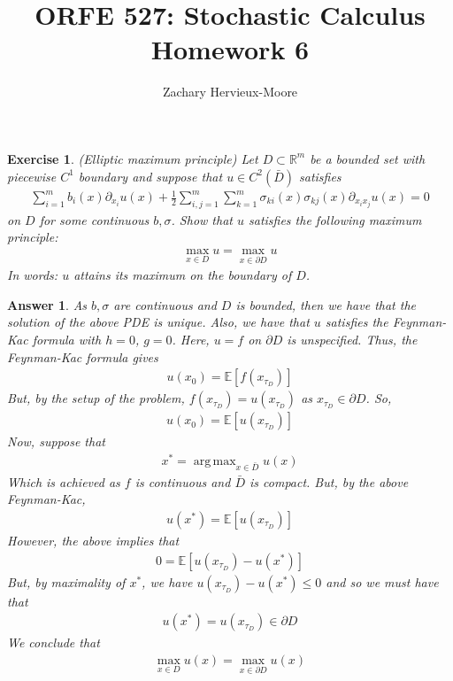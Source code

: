 \documentclass[12pt]{article}
\title{ORFE 527: Stochastic Calculus \\ Homework 6}
\author{Zachary Hervieux-Moore}
\date{\displaydate{date}}
\DeclareMathOperator*{\argmax}{arg\,max}
\theoremstyle{colon}
\newtheorem{exercise}{Exercise}
\newtheorem*{answer}{Answer}
\begin{document}
\maketitle

\clearpage

\begin{exercise}
  (Elliptic maximum principle) Let $D \subset \mathbb{R}^m$ be a bounded set with piecewise $C^1$ boundary and suppose that $u \in C^2 (\bar{D})$ satisfies
  \begin{gather*}
    \sum_{i=1}^m b_i(x) \partial_{x_i} u(x) + \frac{1}{2} \sum_{i,j = 1}^m \sum_{k=1}^m \sigma_{ki}(x) \sigma_{kj}(x) \partial_{x_i x_j} u(x) = 0
  \end{gather*}
  on $D$ for some continuous $b, \sigma$. Show that $u$ satisfies the following \textit{maximum principle}:
  \begin{gather*}
    \max_{x \in D} u = \max_{x \in \partial D} u
  \end{gather*}
  In words: $u$ attains its maximum on the boundary of $D$.
\end{exercise}

\begin{answer}
  As $b, \sigma$ are continuous and $D$ is bounded, then we have that the solution of the above PDE is unique. Also, we have that $u$ satisfies the Feynman-Kac formula with $h = 0$, $g = 0$. Here, $u = f$ on $\partial D$ is unspecified. Thus, the Feynman-Kac formula gives
  \begin{gather*}
    u(x_0) = \mathbb{E}[f(x_{\tau_D})]
  \end{gather*}
  But, by the setup of the problem, $f(x_{\tau_D}) = u(x_{\tau_D})$ as $x_{\tau_D} \in \partial D$. So,
  \begin{gather*}
    u(x_0) = \mathbb{E}[u(x_{\tau_D})]
  \end{gather*}
  Now, suppose that
  \begin{gather*}
    x^* = \argmax_{x \in \bar{D}} u(x)
  \end{gather*}
  Which is achieved as $f$ is continuous and $\bar{D}$ is compact. But, by the above Feynman-Kac,
  \begin{gather*}
    u(x^*) = \mathbb{E}[u(x_{\tau_D})]
  \end{gather*}
  However, the above implies that
  \begin{gather*}
    0 = \mathbb{E}[u(x_{\tau_D}) - u(x^*)]
  \end{gather*}
  But, by maximality of $x^*$, we have $u(x_{\tau_D}) - u(x^*) \leq 0$ and so we must have that
  \begin{gather*}
    u(x^*) = u(x_{\tau_D}) \in \partial D
  \end{gather*}
  We conclude that
  \begin{gather*}
    \max_{x \in D} u(x) = \max_{x \in \partial D} u(x)
  \end{gather*}
\end{answer}
\end{document}
